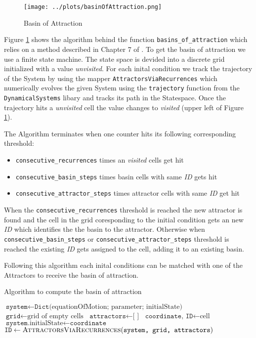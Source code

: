 \documentclass[a4paper,12pt, twoside]{article} %
\begin{document}
\begin{figure}[H]
  \begin{centering}
    \texttt{[image: ../plots/basinOfAttraction.png]} 
    \caption{Basin of Attraction}\label{fig:basinAlgo}
  \end{centering}
\end{figure}

Figure \ref{fig:basinAlgo} shows the algorithm behind the function \texttt{basins_of_attraction} which relies on a method described in Chapter 7 of \autocite{nusse2012dynamics}.
To get the basin of attraction we use a finite state machine. The state space is devided into a discrete grid initialized with a value \textit{unvisited}.
For each inital condition we track the trajectory of the System by using the mapper \texttt{AttractorsViaRecurrences} which numerically evolves the given System using the \texttt{trajectory} function 
from the \texttt{DynamicalSystems} libary and tracks its path in the Statespace. Once the trajectory hits a \textit{unvisited} cell the value changes to  \textit{visited} (upper left of Figure \ref{fig:basinAlgo}).

The Algorithm terminates when one counter hits its following corresponding threshold:
\begin{itemize}[itemsep=-4pt]
  \item \texttt{consecutive_recurrences} times an \textit{visited} cells get hit
  \item \texttt{consecutive_basin_steps} times basin cells with same \textit{ID} gets hit
  \item \texttt{consecutive_attractor_steps} times attractor cells with same \textit{ID} get hit
\end{itemize}

When the \texttt{consecutive_recurrences} threshold is reached the new attractor is found and the cell in the grid coresponding to the initial condition gets an new \textit{ID} which identifies the the basin to the attractor.
Otherwise when \texttt{consecutive_basin_steps} or \texttt{consecutive_attractor_steps} threshold is reached the existing \textit{ID} gets assigned to the cell, adding it to an existing basin. 

Following this algorithm each inital conditions can be matched with one of the Attractors to receive the basin of attraction.



\begin{algorithm}[H]
  \caption{Algorithm to compute the basin of attraction}\label{BoA}
  \begin{algorithmic}
    \State $\texttt{system} \gets \texttt{Dict}\text{(equationOfMotion; parameter; initialState)}$
    \State $\texttt{grid} \gets \text{grid of empty cells} $
    \State $\texttt{attractors} \gets \text{[ ]}$
      \State $\texttt{coordinate, ID} \gets \text{cell}$
      \State $\texttt{system}\text{.initialState} \gets \texttt{coordinate}$
      \State $\texttt{ID} \gets \Call{AttractorsViaRecurrences}{\texttt{system, grid, attractors}}$
    \EndFor
  \EndProcedure
\end{algorithmic}
\end{algorithm}
\end{document}
